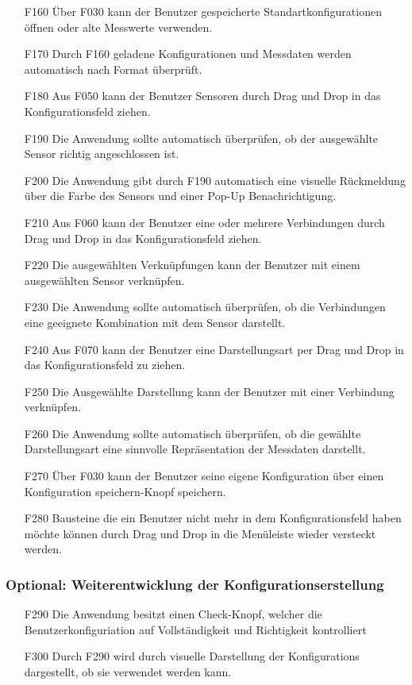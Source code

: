 \documentclass[parskip=full]{scrartcl}
\begin{document}
\begin{itemize}

\item[F160] Über F030 kann der Benutzer gespeicherte Standartkonfigurationen öffnen oder alte Messwerte verwenden.
\item[F170] Durch F160 geladene Konfigurationen und Messdaten werden automatisch nach Format überprüft.
\item[F180] Aus F050 kann der Benutzer Sensoren durch Drag und Drop in das Konfigurationsfeld ziehen.
\item[F190] Die Anwendung sollte automatisch überprüfen, ob der ausgewählte Sensor richtig angeschlossen ist.
\item[F200] Die Anwendung gibt durch F190 automatisch eine visuelle Rückmeldung über die Farbe des Sensors und einer Pop-Up Benachrichtigung.
\item[F210] Aus F060 kann der Benutzer eine oder mehrere Verbindungen durch Drag und Drop in das Konfigurationsfeld ziehen.
\item[F220] Die ausgewählten Verknüpfungen kann der Benutzer mit einem ausgewählten Sensor verknüpfen.
\item[F230] Die Anwendung sollte automatisch überprüfen, ob die Verbindungen eine geeignete Kombination mit dem Sensor darstellt.
\item[F240] Aus F070 kann der Benutzer eine Darstellungsart per Drag und Drop in das Konfigurationsfeld zu ziehen.
\item[F250] Die Ausgewählte Darstellung kann der Benutzer mit einer Verbindung verknüpfen.
\item[F260] Die Anwendung sollte automatisch überprüfen, ob die gewählte Darstellungsart eine sinnvolle Repräsentation der Messdaten darstellt.
\item[F270] Über F030 kann der Benutzer seine eigene Konfiguration über einen Konfiguration speichern-Knopf speichern.
\item[F280] Bausteine die ein Benutzer nicht mehr in dem Konfigurationsfeld haben möchte können durch Drag und Drop in die Menüleiste wieder versteckt werden.

\end{itemize}

\subsubsection{Optional: Weiterentwicklung der Konfigurationserstellung}

\begin{itemize}

\item[F290] Die Anwendung besitzt einen Check-Knopf, welcher die Benutzerkonfiguriation auf Vollständigkeit und Richtigkeit
kontrolliert
\item[F300] Durch F290 wird durch visuelle Darstellung der Konfigurations dargestellt, ob sie verwendet werden kann.

\end{itemize}
\end{document}
